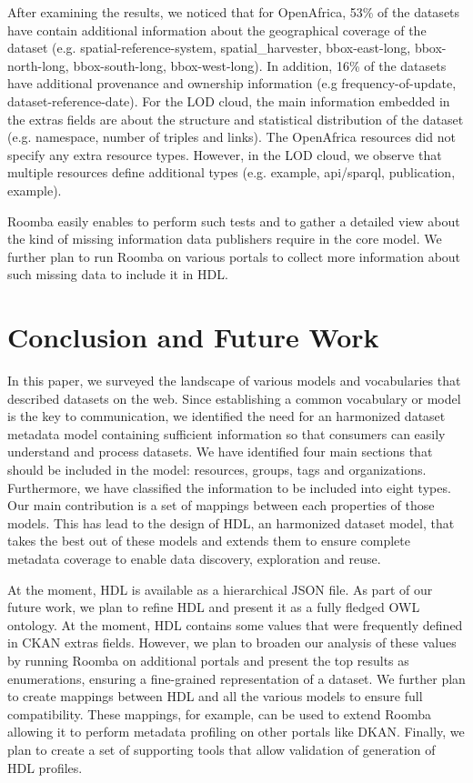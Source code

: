 After examining the results, we noticed that for OpenAfrica, 53\% of the datasets have contain additional information about the geographical coverage of the dataset (e.g. spatial-reference-system, spatial\_harvester, bbox-east-long, bbox-north-long, bbox-south-long, bbox-west-long). In addition, 16\% of the datasets have additional provenance and ownership information (e.g frequency-of-update, dataset-reference-date). For the LOD cloud, the main information embedded in the extras fields are about the structure and statistical distribution of the dataset (e.g. namespace, number of triples and links). The OpenAfrica resources did not specify any extra resource types. However, in the LOD cloud, we observe that multiple resources define additional types (e.g. example, api/sparql, publication, example).

Roomba easily enables to perform such tests and to gather a detailed view about the kind of missing information data publishers require in the core model. We further plan to run Roomba on various portals to collect more information about such missing data to include it in HDL.


\section{Conclusion and Future Work}
In this paper, we surveyed the landscape of various models and vocabularies that described datasets on the web. Since establishing a common vocabulary or model is the key to communication, we identified the need for an harmonized dataset metadata model containing sufficient information so that consumers can easily understand and process datasets. We have identified four main sections that should be included in the model: resources, groups, tags and organizations. Furthermore, we have classified the information to be included into eight types. Our main contribution is a set of mappings between each properties of those models. This has lead to the design of HDL, an harmonized dataset model, that takes the best out of these models and extends them to ensure complete metadata coverage to enable data discovery, exploration and reuse.

At the moment, HDL is available as a hierarchical JSON file. As part of our future work, we plan to refine HDL and present it as a fully fledged OWL ontology. At the moment, HDL contains some values that were frequently defined in CKAN extras fields. However, we plan to broaden our analysis of these values by running Roomba on additional portals and present the top results as enumerations, ensuring a fine-grained representation of a dataset. We further plan to create mappings between HDL and all the various models to ensure full compatibility. These mappings, for example, can be used to extend Roomba allowing it to perform metadata profiling on other portals like DKAN. Finally, we plan to create a set of supporting tools that allow validation of generation of HDL profiles.
